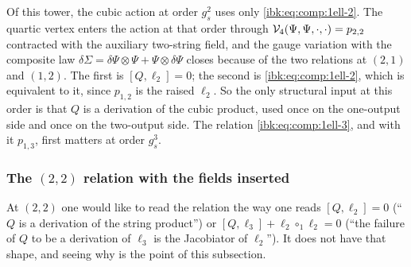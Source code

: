 Of this tower, the cubic action at order $g_s^2$ uses only \eqref{ibk:eq:comp:1ell-2}. The quartic vertex enters the action at that order through ${\mathcal{V}}_4(\Psi,\Psi,\cdot,\cdot)=p_{2,2}$ contracted with the auxiliary two-string field, and the gauge variation with the composite law $\delta\Sigma=\delta\Psi\otimes\Psi+\Psi\otimes\delta\Psi$ closes because of the two relations at $(2,1)$ and $(1,2)$. The first is $[Q,\ell_2]=0$; the second is \eqref{ibk:eq:comp:1ell-2}, which is equivalent to it, since $p_{1,2}$ is the raised $\ell_2$. So the only structural input at this order is that $Q$ is a derivation of the cubic product, used once on the one-output side and once on the two-output side. The relation \eqref{ibk:eq:comp:1ell-3}, and with it $p_{1,3}$, first matters at order $g_s^3$.

\subsubsection{The \texorpdfstring{$(2,2)$}{(2,2)} relation with the fields inserted}
\label{ibk:sec:comp:22}

At $(2,2)$ one would like to read the relation the way one reads $[Q,\ell_2]=0$ (\enquote{$Q$ is a derivation of the string product}) or $[Q,\ell_3]+\ell_2\circ_1\ell_2=0$ (\enquote{the failure of $Q$ to be a derivation of $\ell_3$ is the Jacobiator of $\ell_2$}). It does not have that shape, and seeing why is the point of this subsection.

